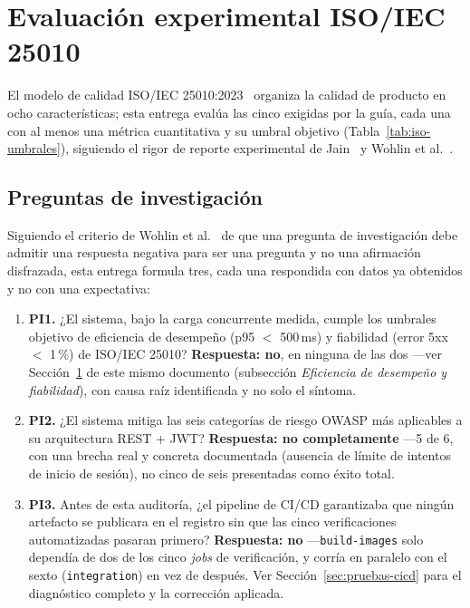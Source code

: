 \section{Evaluación experimental ISO/IEC 25010}
\label{sec:iso25010}

El modelo de calidad ISO/IEC 25010:2023~\cite{iso25010} organiza la calidad de producto en ocho
características; esta entrega evalúa las cinco exigidas por la guía, cada una con al menos una
métrica cuantitativa y su umbral objetivo (Tabla~\ref{tab:iso-umbrales}), siguiendo el rigor de
reporte experimental de Jain~\cite{jain1991art} y Wohlin et al.~\cite{wohlin2012experimentation}.

\subsection{Preguntas de investigación}
\label{sec:preguntas-investigacion}

Siguiendo el criterio de Wohlin et al.~\cite{wohlin2012experimentation} de que una pregunta de
investigación debe admitir una respuesta negativa para ser una pregunta y no una afirmación
disfrazada, esta entrega formula tres, cada una respondida con datos ya obtenidos y no con una
expectativa:

\begin{enumerate}[nosep]
  \item \textbf{PI1.} ¿El sistema, bajo la carga concurrente medida, cumple los umbrales
        objetivo de eficiencia de desempeño (p95 $<$ 500\,ms) y fiabilidad (error 5xx $<$ 1\,\%)
        de ISO/IEC 25010? \textbf{Respuesta: no}, en ninguna de las dos —ver
        Sección~\ref{sec:iso25010} de este mismo documento (subsección \emph{Eficiencia de
        desempeño y fiabilidad}), con causa raíz identificada y no solo el síntoma.
  \item \textbf{PI2.} ¿El sistema mitiga las seis categorías de riesgo OWASP más aplicables a su
        arquitectura REST + JWT? \textbf{Respuesta: no completamente} —5 de 6, con una brecha
        real y concreta documentada (ausencia de límite de intentos de inicio de sesión), no
        cinco de seis presentadas como éxito total.
  \item \textbf{PI3.} Antes de esta auditoría, ¿el pipeline de CI/CD garantizaba que ningún
        artefacto se publicara en el registro sin que las cinco verificaciones automatizadas
        pasaran primero? \textbf{Respuesta: no} —\texttt{build-images} solo dependía de dos de
        los cinco \emph{jobs} de verificación, y corría en paralelo con el sexto
        (\texttt{integration}) en vez de después. Ver Sección~\ref{sec:pruebas-cicd} para el
        diagnóstico completo y la corrección aplicada.
\end{enumerate}

